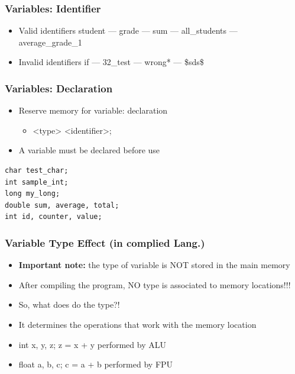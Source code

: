 \documentclass{../c-lecture}
\begin{document}
\begin{frame}
  \frametitle{Variables: Identifier}
  \begin{itemize}
    \item Valid identifiers
    student --- grade --- sum --- all_students --- average_grade_1
    \item Invalid identifiers
    if --- 32_test --- wrong* --- \$sds\$
  \end{itemize}
\end{frame}

\begin{frame}[fragile]
  \frametitle{Variables: Declaration}
  \begin{itemize}
    \item
      Reserve memory for variable:
      {\color{Orange} declaration}
    \begin{itemize}
      \item <type> <identifier>;
    \end{itemize}
    \item
      A variable must be declared {\color{LimeGreen} before} use
  \end{itemize}
  \begin{verbatim}
char test_char;
int sample_int;
long my_long;
double sum, average, total;
int id, counter, value;
  \end{verbatim}
\end{frame}

\begin{frame}
  \frametitle{Variable Type Effect (in complied Lang.)}
  \begin{itemize}
    \item \textbf{\color{Orange} Important note:} the type of variable is
      NOT stored in the main memory
    \item After compiling the program, NO type is associated to memory locations!!!
  \end{itemize}
  \begin{itemize}
    \item So, what does do the type?!
    \item
      It determines the {\color{Green} operations} that work
      with the memory location
  \end{itemize}
  \begin{itemize}
    \item
      int x, y, z; z = x + y performed by {\color{Cyan} ALU}
    \item
      float a, b, c; c = a + b performed by {\color{Cyan} FPU}
  \end{itemize}
\end{frame}
\end{document}
